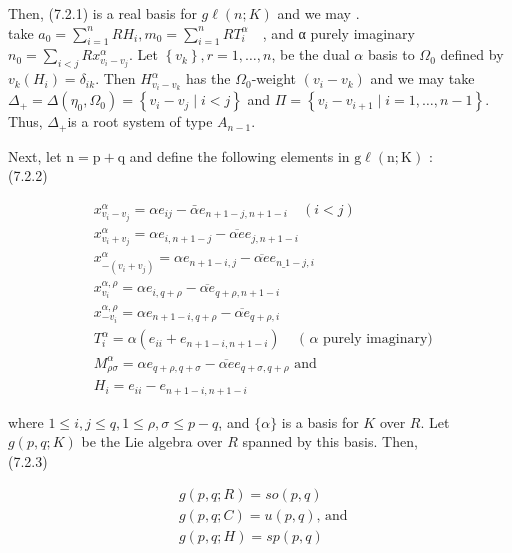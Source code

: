 \documentclass[10pt]{article}
\begin{document}
Then, (7.2.1) is a real basis for $g \ell(n ; K)$ and we may .\\
take $a_{0}=\sum_{i=1}^{n} R H_{i}, m_{0}=\sum_{i=1}^{n} R T_{i}^{\alpha} \quad$, and α purely imaginary\\
$n_{0}=\sum_{i<j} R x_{v_{i}-v_{j}}^{\alpha}$. Let $\left\{v_{k}\right\}, r=1, \ldots, n$, be the dual $\alpha$ basis to $\Omega_{0}$ defined by $v_{k}\left(H_{i}\right)=\delta_{i k}$. Then $H_{v_{i}-v_{k}}^{\alpha}$ has the $\Omega_{0}$-weight $\left(v_{i}-v_{k}\right)$ and we may take $\Delta_{+}=\Delta\left(\eta_{0}, \Omega_{0}\right)=\left\{v_{i}-v_{j} \mid i<j\right\}$ and $\Pi=\left\{v_{i}-v_{i+1} \mid i=1, \ldots, n-1\right\}$. Thus, $\Delta_{+}$is a root system of type $A_{n-1}$.

Next, let $\mathrm{n}=\mathrm{p}+\mathrm{q}$ and define the following elements in $\mathrm{g} \ell(\mathrm{n} ; \mathrm{K})$ :\\
(7.2.2)

$$
\begin{aligned}
& x_{v_{i}-v_{j}}^{\alpha}=\alpha e_{i j}-\bar{\alpha} e_{n+1-j, n+1-i} \quad(i<j) \\
& x_{v_{i}+v_{j}}^{\alpha}=\alpha e_{i, n+1-j}-\overline{\alpha e} e_{j, n+1-i} \\
& x_{-\left(v_{i}+v_{j}\right)}^{\alpha}=\alpha e_{n+1-i, j}-\overline{\alpha e} e_{n \_1-j, i} \\
& x_{v_{i}}^{\alpha, \rho}=\alpha e_{i, q+\rho}-\overline{\alpha e}{ }_{q+\rho, n+1-i} \\
& x_{-v_{i}}^{\alpha, \rho}=\alpha e_{n+1-i, q+\rho}-\overline{\alpha e}{ }_{q+\rho, i} \\
& T_{i}^{\alpha}=\alpha\left(e_{i i}+e_{n+1-i, n+1-i}\right) \quad \text { ( } \alpha \text { purely imaginary) } \\
& M_{\rho \sigma}^{\alpha}=\alpha e_{q+\rho, q+\sigma}-\overline{\alpha e} e_{q+\sigma, q+\rho} \text { and } \\
& H_{i}=e_{i i}-e_{n+1-i, n+1-i}
\end{aligned}
$$

where $1 \leq i, j \leq q, 1 \leq \rho, \sigma \leq p-q$, and $\{\alpha\}$ is a basis for $K$ over $R$. Let $g(p, q ; K)$ be the Lie algebra over $R$ spanned by this basis. Then,\\
(7.2.3)

$$
\begin{aligned}
& g(p, q ; R)=s o(p, q) \\
& g(p, q ; C)=u(p, q) \text {, and } \\
& g(p, q ; H)=s p(p, q)
\end{aligned}
$$
\end{document}
